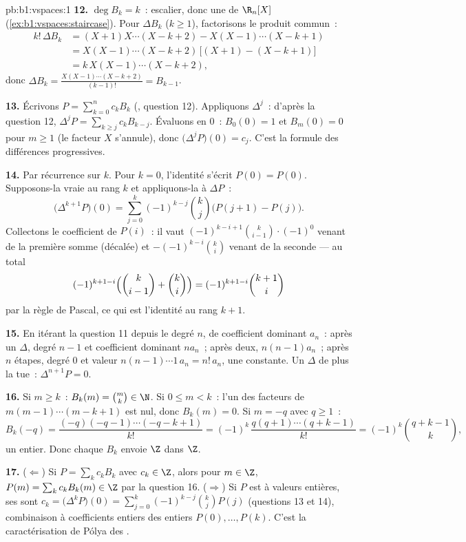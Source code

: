 \begin{solution}{pb:b1:vspaces:1}
\textbf{12.} $\deg B_k = k$~: escalier, donc une  de
$\R_n[X]$ (\cref{ex:b1:vspaces:staircase}). Pour $\Delta B_k$
($k \geq 1$), factorisons le produit commun~:
\begin{align*}
k!\,\Delta B_k
&= (X+1)X\cdots(X-k+2) - X(X-1)\cdots(X-k+1) \\
&= X(X-1)\cdots(X-k+2)\,\bigl[(X+1) - (X-k+1)\bigr] \\
&= k\,X(X-1)\cdots(X-k+2),
\end{align*}
donc $\Delta B_k = \frac{X(X-1)\cdots(X-k+2)}{(k-1)!} = B_{k-1}$.

\textbf{13.} Écrivons $P = \sum_{k=0}^{n} c_k B_k$ (, question
12). Appliquons $\Delta^{j}$~: d'après la question 12, $\Delta^{j} P =
\sum_{k \geq j} c_k B_{k-j}$. Évaluons en $0$~: $B_0(0) = 1$ et
$B_m(0) = 0$ pour $m \geq 1$ (le facteur $X$ s'annule), donc
$\bigl(\Delta^{j}P\bigr)(0) = c_j$. C'est la formule des différences
progressives.

\textbf{14.} Par récurrence sur $k$. Pour $k = 0$, l'identité s'écrit
$P(0) = P(0)$. Supposons-la vraie au rang $k$ et appliquons-la à
$\Delta P$~:
\[
\bigl(\Delta^{k+1} P\bigr)(0)
= \sum_{j=0}^{k} (-1)^{k-j}\binom kj \bigl(P(j+1) - P(j)\bigr).
\]
Collectons le coefficient de $P(i)$~: il vaut $(-1)^{k-i+1}\binom
k{i-1}\cdot(-1)^{0}$ venant de la première somme (décalée) et
$-(-1)^{k-i}\binom ki$ venant de la seconde --- au total
\[
(-1)^{k+1-i}\Bigl(\binom k{i-1} + \binom ki\Bigr)
= (-1)^{k+1-i}\binom{k+1}i
\]
par la règle de Pascal, ce qui est l'identité au rang $k + 1$.

\textbf{15.} En itérant la question 11 depuis le degré $n$, de
coefficient dominant $a_n$~: après un $\Delta$, degré $n-1$ et
coefficient dominant $n a_n$~; après deux, $n(n-1)a_n$~; après $n$
étapes, degré $0$ et valeur $n(n-1)\cdots 1\, a_n = n!\,a_n$, une
constante. Un $\Delta$ de plus la tue~: $\Delta^{n+1}P = 0$.

\textbf{16.} Si $m \geq k$~: $B_k(m) = \binom mk \in \N$. Si $0
\leq m < k$~: l'un des facteurs de $m(m-1)\cdots(m-k+1)$ est nul, donc
$B_k(m) = 0$. Si $m = -q$ avec $q \geq 1$~:
\[
B_k(-q) = \frac{(-q)(-q-1)\cdots(-q-k+1)}{k!}
= (-1)^k\,\frac{q(q+1)\cdots(q+k-1)}{k!}
= (-1)^k \binom{q+k-1}{k},
\]
un entier. Donc chaque $B_k$ envoie $\Z$ dans $\Z$.

\textbf{17.} ($\Leftarrow$) Si $P = \sum_k c_k B_k$ avec $c_k \in
\Z$, alors pour $m \in \Z$, $P(m) = \sum_k c_k B_k(m) \in \Z$ par la
question 16. ($\Rightarrow$) Si $P$ est à valeurs entières, ses
 sont $c_k = \bigl(\Delta^k P\bigr)(0) = \sum_{j=0}^k
(-1)^{k-j}\binom kj P(j)$ (questions 13 et 14), combinaison à
coefficients entiers des entiers $P(0), \dots, P(k)$. C'est la
caractérisation de Pólya des .


\end{solution}
